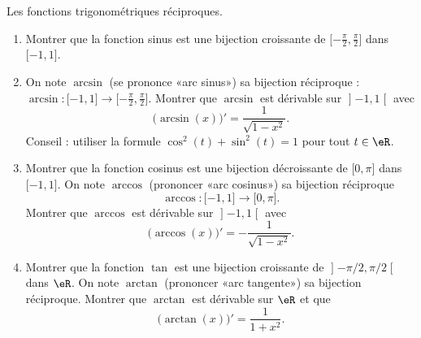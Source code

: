 
\begin{exercice}\label{exoTD4-0002}

	Les fonctions trigonométriques réciproques.

	\begin{enumerate}
		\item
			Montrer que la fonction sinus est une bijection croissante de $\mathopen[ -\frac{ \pi }{2} , \frac{ \pi }{2} \mathclose]$ dans $\mathopen[ -1 , 1 \mathclose]$.
		\item
			On note $\arcsin$ (se prononce «arc sinus») sa bijection réciproque : $\arcsin\colon \mathopen[ -1 , 1 \mathclose]\to \mathopen[ -\frac{ \pi }{2} , \frac{ \pi }{2} \mathclose]$. Montrer que $\arcsin$ est dérivable sur $\mathopen] -1 , 1 \mathclose[$ avec
			\begin{equation}
				\big( \arcsin(x) \big)'=\frac{1}{ \sqrt{1-x^2} }.
			\end{equation}
			Conseil : utiliser la formule $\cos^2(t)+\sin^2(t)=1$ pour tout $t\in\eR$.
		\item
			Montrer que la fonction cosinus est une bijection décroissante de $\mathopen[ 0 , \pi \mathclose]$ dans $\mathopen[ -1 , 1 \mathclose]$. On note $\arccos$ (prononcer «arc cosinus») sa bijection réciproque
			\begin{equation}
				\arccos\colon \mathopen[ -1 , 1 \mathclose]\to \mathopen[ 0 , \pi \mathclose].
			\end{equation}
			Montrer que $\arccos$ est dérivable sur $\mathopen] -1 , 1 \mathclose[$ avec
			\begin{equation}
				\big( \arccos(x) \big)'=-\frac{ 1 }{ \sqrt{1-x^2} }.
			\end{equation}
		\item
			Montrer que la fonction $\tan$ est une bijection croissante de $\mathopen] -\pi/2 , \pi/2 \mathclose[$ dans $\eR$. On note $\arctan$ (prononcer «arc tangente») sa bijection réciproque. Montrer que $\arctan$ est dérivable sur $\eR$ et que
			\begin{equation}
				\big( \arctan(x) \big)'=\frac{1}{ 1+x^2 }.
			\end{equation}
	\end{enumerate}

\end{exercice}

